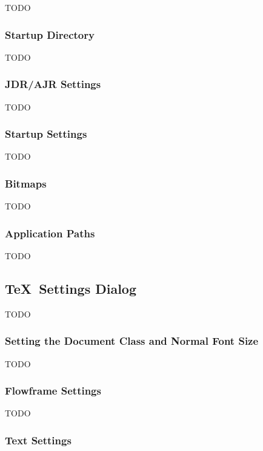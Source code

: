 TODO


\subsubsection{Startup Directory}\label{sec:startdir}

TODO


\subsubsection{JDR/AJR Settings}\label{sec:jdrsettings}

TODO


\subsubsection{Startup Settings}\label{sec:initsettings}

TODO


\subsubsection{Bitmaps}\label{sec:bitmapconfig}

TODO


\subsubsection{Application Paths}\label{sec:processes}

TODO


\subsection{\TeX\ Settings Dialog}\label{sec:texconfig}

TODO


\subsubsection{Setting the Document Class and Normal Font Size}
\label{sec:normalsize}

TODO


\subsubsection{Flowframe Settings}\label{sec:texconfigflf}

TODO


\subsubsection{Text Settings}\label{sec:texconfigtext}

